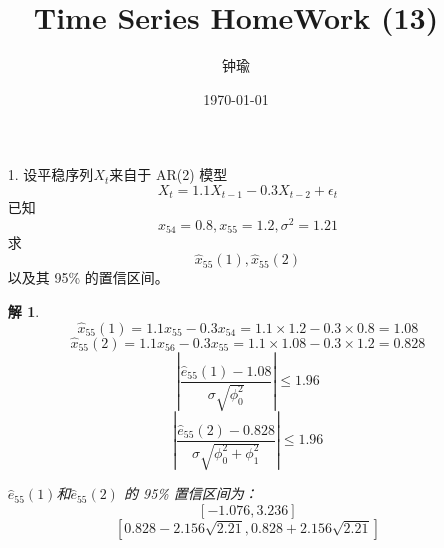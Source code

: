 \documentclass[11pt,a4paper]{ctexart}
\title{Time Series HomeWork (13)}
\author{钟瑜 \quad 222018314210044}
\date{\today}
\newtheorem*{solution}{解}
\begin{document}
\maketitle
\pagestyle{plain}%
\begin{enumerate}
	
\item[1.] 设平稳序列$ X_t $来自于 AR(2) 模型
\[X_t = 1.1X_{t−1} − 0.3X_{t−2} + \epsilon_t\]
已知 \[x_54 = 0.8, x_55 = 1.2, \sigma^2  = 1.21\]求\[ \hat{x}_{55}(1),  \hat{x}_{55}(2)\] 以及其 95\% 的置信区间。

\begin{solution}
\[\hat{x}_{55}(1)= 1.1x_{55} − 0.3x_{54} = 1.1 × 1.2 − 0.3 × 0.8 = 1.08\]
\[\hat{x}_{55}(2) = 1.1x_{56} − 0.3x_{55} = 1.1 × 1.08 − 0.3 × 1.2 = 0.828\]
\[
|\frac{\hat{e}_{55}(1)-1.08}{\sigma\sqrt{\phi^2_0}}|\leq1.96
\]
\[
|\frac{\hat{e}_{55}(2)-0.828}{\sigma\sqrt{\phi^2_0+\phi^2_1}}|\le1.96
\]

$ \hat{e}_{55}(1) $和$ \hat{e}_{55}(2) $ 的 95\% 置信区间为：
\[[−1.076, 3.236]\]
\[[0.828 − 2.156\sqrt{2.21}, 0.828 + 2.156\sqrt{2.21}]\]


\end{solution}

\end{enumerate}
\end{document}
